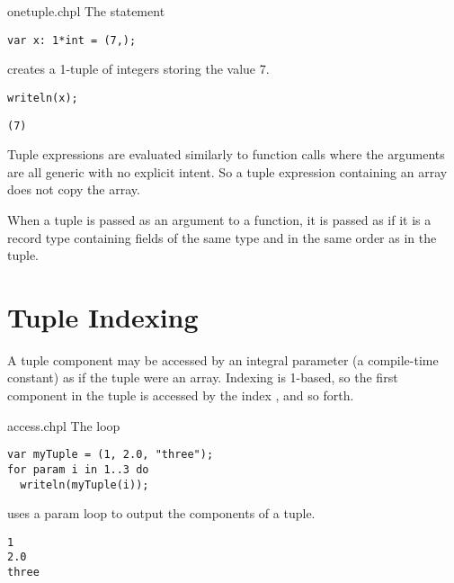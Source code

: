 \begin{chapelexample}{onetuple.chpl}
The statement
\begin{chapel}
\begin{verbatim}
var x: 1*int = (7,);
\end{verbatim}
\end{chapel}
creates a 1-tuple of integers storing the value 7.
\begin{chapelpost}
\begin{verbatim}
writeln(x); 
\end{verbatim}
\end{chapelpost}
\begin{chapeloutput}
\begin{verbatim}
(7)
\end{verbatim}
\end{chapeloutput}
\end{chapelexample}

Tuple expressions are evaluated similarly to function calls where the
arguments are all generic with no explicit intent.  So a tuple
expression containing an array does not copy the array.  

When a tuple is passed as an argument to a function, it is passed as
if it is a record type containing fields of the same type and in
the same order as in the tuple.

\section{Tuple Indexing}
\label{Tuple_Indexing}

A tuple component may be accessed by an integral parameter (a compile-time
constant) as if the tuple were an array.  Indexing is 1-based, so the
first component in the tuple is accessed by the index , and so
forth.

\begin{chapelexample}{access.chpl}
The loop
\begin{chapel}
\begin{verbatim}
var myTuple = (1, 2.0, "three");
for param i in 1..3 do
  writeln(myTuple(i));
\end{verbatim}
\end{chapel}
uses a param loop to output the components of a tuple.
\begin{chapeloutput}
\begin{verbatim}
1
2.0
three
\end{verbatim}
\end{chapeloutput}
\end{chapelexample}

